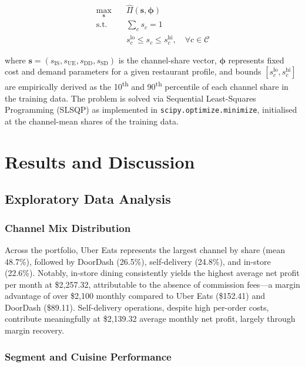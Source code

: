 \documentclass[10pt,a4paper,twocolumn]{article}
\begin{document}
\begin{align}
  \max_{\mathbf{s}} \quad & \hat{\Pi}(\mathbf{s}, \boldsymbol{\phi}) \label{eq:obj} \\
  \text{s.t.} \quad
  & \sum_{c} s_c = 1 \label{eq:sum_constraint} \\
  & s_c^{\text{lo}} \leq s_c \leq s_c^{\text{hi}}, \quad \forall c \in \mathcal{C}
  \label{eq:bound_constraint}
\end{align}

where $\mathbf{s} = (s_{\text{IS}}, s_{\text{UE}}, s_{\text{DD}}, s_{\text{SD}})$ is
the channel-share vector, $\boldsymbol{\phi}$ represents fixed cost and demand
parameters for a given restaurant profile, and bounds $[s_c^{\text{lo}}, s_c^{\text{hi}}]$
are empirically derived as the 10\textsuperscript{th} and 90\textsuperscript{th}
percentile of each channel share in the training data. The problem is solved via
Sequential Least-Squares Programming (SLSQP) as implemented in \texttt{scipy.optimize.minimize},
initialised at the channel-mean shares of the training data.

\section{Results and Discussion}
\label{sec:results}

\subsection{Exploratory Data Analysis}

\subsubsection{Channel Mix Distribution}

Across the portfolio, Uber Eats represents the largest channel by share (mean 48.7\%),
followed by DoorDash (26.5\%), self-delivery (24.8\%), and in-store (22.6\%).
Notably, in-store dining consistently yields the highest average net profit per month
at \$2{,}257.32, attributable to the absence of commission fees—a margin advantage of
over \$2{,}100 monthly compared to Uber Eats (\$152.41) and DoorDash (\$89.11).
Self-delivery operations, despite high per-order costs, contribute meaningfully at
\$2{,}139.32 average monthly net profit, largely through margin recovery.

\subsubsection{Segment and Cuisine Performance}
\end{document}
